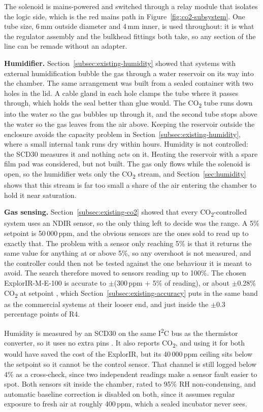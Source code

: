 The solenoid is mains-powered and switched through a relay module that isolates the logic side, which is the red mains path in Figure~\ref{fig:co2-subsystem}. One tube size, 6\,mm outside diameter and 4\,mm inner, is used throughout: it is what the regulator assembly and the bulkhead fittings both take, so any section of the line can be remade without an adapter.

\textbf{Humidifier.} Section~\ref{subsec:existing-humidity} showed that systems with external humidification bubble the gas through a water reservoir on its way into the chamber. The same arrangement was built from a sealed container with two holes in the lid. A cable gland in each hole clamps the tube where it passes through, which holds the seal better than glue would. The CO\textsubscript{2} tube runs down into the water so the gas bubbles up through it, and the second tube stops above the water so the gas leaves from the air above. Keeping the reservoir outside the enclosure avoids the capacity problem in Section~\ref{subsec:existing-humidity}, where a small internal tank runs dry within hours. Humidity is not controlled: the SCD30 measures it and nothing acts on it. Heating the reservoir with a spare film pad was considered, but not built. The gas only flows while the solenoid is open, so the humidifier wets only the CO\textsubscript{2} stream, and Section~\ref{sec:humidity} shows that this stream is far too small a share of the air entering the chamber to hold it near saturation.

\textbf{Gas sensing.} Section~\ref{subsec:existing-co2} showed that every CO\textsubscript{2}-controlled system uses an NDIR sensor, so the only thing left to decide was the range. A 5\% setpoint is 50\,000\,ppm, and the obvious sensors are the ones sold to read up to exactly that. The problem with a sensor only reaching 5\% is that it returns the same value for anything at or above 5\%, so any overshoot is not measured, and the controller could then not be tested against the one behaviour it is meant to avoid. The search therefore moved to sensors reading up to 100\%. The chosen ExplorIR-M-E-100 is accurate to $\pm$(300\,ppm $+$ 5\% of reading), or about $\pm$0.28\% CO\textsubscript{2} at setpoint \citep{gss_explorir_2021}, which Section~\ref{subsec:existing-accuracy} puts in the same band as the commercial systems at their looser end, and just inside the $\pm$0.3 percentage points of R4.

Humidity is measured by an SCD30 on the same I\textsuperscript{2}C bus as the thermistor converter, so it uses no extra pins \citep{sensirion_scd30_2020}. It also reports CO\textsubscript{2}, and using it for both would have saved the cost of the ExplorIR, but its 40\,000\,ppm ceiling sits below the setpoint so it cannot be the control sensor. That channel is still logged below 4\% as a cross-check, since two independent readings make a sensor fault easier to spot. Both sensors sit inside the chamber, rated to 95\% RH non-condensing, and automatic baseline correction is disabled on both, since it assumes regular exposure to fresh air at roughly 400\,ppm, which a sealed incubator never sees.

